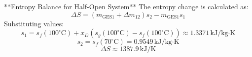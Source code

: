 **Entropy Balance for Half-Open System**  
The entropy change is calculated as:  
\[
\Delta S = \left( m_{\text{GES1}} + \Delta m_{12} \right) s_2 - m_{\text{GES1}} s_1
\]  
Substituting values:  
\[
s_1 = s_f(100^\circ\text{C}) + x_D \left( s_g(100^\circ\text{C}) - s_f(100^\circ\text{C}) \right) \approx 1.3371 \, \text{kJ/kg·K}
\]  
\[
s_2 = s_f(70^\circ\text{C}) = 0.9549 \, \text{kJ/kg·K}
\]  
\[
\Delta S \approx 1387.9 \, \text{kJ/K}
\]